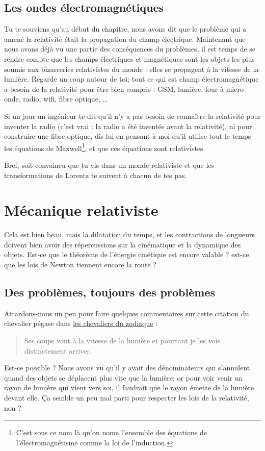 \subsection{Les ondes électromagnétiques}

Tu te souviens qu'au début du chapitre, nous avons dit que le problème qui a amené la relativité était la propagation du champ électrique. Maintenant que nous avons déjà vu une partie des conséquences du problèmes, il est temps de se rendre compte que les champs électriques et magnétiques sont les objets les plus soumis aux bizarreries relativistes du monde : elles se propagent à la vitesse de la lumière. Regarde un coup autour de toi; tout ce qui est champ électromagnétique a besoin de la relativité pour être bien compris : GSM, lumière, four à micro-onde, radio, wifi, fibre optique, \ldots

Si un jour un ingénieur te dit qu'il n'y a pas besoin de connaître la relativité pour inventer la radio (c'est vrai : la radio a été inventée avant la relativité), ni pour construire une fibre optique, dis lui en pensant à moi qu'il utilise tout le temps les équations de Maxwell\footnote{C'est sous ce nom là qu'on nome l'ensemble des équations de l'électromagnétisme comme la loi de l'induction.}, et que ces équations sont relativistes.

Bref, soit convaincu que tu vis dans un monde relativiste et que les transformations de Lorentz te suivent à chacun de tes pas.

\section{Mécanique relativiste}

Cela est bien beau, mais la dilatation du temps, et les contractions de longueurs doivent bien avoir des répercussions sur la cinématique et la dynamique des objets. Est-ce que le théorème de l'énergie cinétique est encore valable ? est-ce que les lois de Newton tiennent encore la route ?


\subsection{Des problèmes, toujours des problèmes}


Attardons-nous un peu pour faire quelques commentaires sur cette citation du chevalier pégase dans \href{http://fr.wikipedia.org/wiki/Les_Chevaliers_du_Zodiaque}{les chevaliers du zodiaque} : 
\begin{quote}
Ses coups vont à la vitesse de la lumière et pourtant je les vois distinctement arriver.  
\end{quote}
Est-ce possible ? Nous avons vu qu'il y avait des dénominateurs qui s'annulent quand des objets se déplacent plus vite que la lumière; or pour voir venir un rayon de lumière qui vient vers soi, il faudrait que le rayon émette de la lumière devant elle. Ça semble un peu mal parti pour respecter les lois de la relativité, non ?

